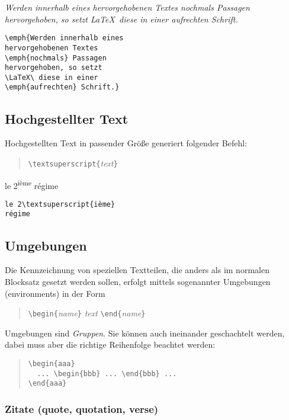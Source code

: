 \exa 
\emph{Werden innerhalb eines hervorgehobenen Textes
\emph{nochmals} Passagen hervorgehoben, so setzt \LaTeX\ diese in
einer \emph{aufrechten} Schrift.}
\exb
\begin{verbatim}
\emph{Werden innerhalb eines 
hervorgehobenen Textes 
\emph{nochmals} Passagen
hervorgehoben, so setzt
\LaTeX\ diese in einer 
\emph{aufrechten} Schrift.}
\end{verbatim}
\exc


\subsection{Hochgestellter Text}
Hochgestellten Text in passender Größe generiert folgender Befehl:
\begin{quote}
\verb|\textsuperscript{|\textit{text}\verb|}|
\end{quote}
\exa
le 2\textsuperscript{ième} régime
\exb
\begin{verbatim}
le 2\textsuperscript{ième}
régime
\end{verbatim}
\exc




\subsection{Umgebungen} \label{env}

Die Kennzeichnung von speziellen Textteilen, die anders als im
normalen Blocksatz gesetzt werden sollen, erfolgt mittels
sogenannter Umgebungen (environments) in der Form
\begin{quote}
\verb|\begin{|\textit{name}\verb|}|\quad
   \textit{text}\quad
   \verb|\end{|\textit{name}\verb|}|
\end{quote}
Umgebungen sind \emph{Gruppen}.
Sie können auch ineinander geschachtelt werden, dabei muss aber
die richtige Reihenfolge beachtet werden:
\begin{quote}
\verb|\begin{aaa}|\\
\verb|  ... \begin{bbb} ... \end{bbb} ... |\\
\verb|\end{aaa}|
\end{quote}


\subsubsection{Zitate (quote, quotation, verse)}
 
